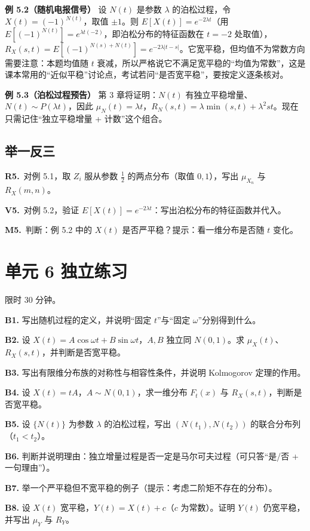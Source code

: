 \documentclass[UTF8,a4paper,11pt]{ctexart}
\newcommand{\PracticeQuestion}[3]{\par\Needspace{4\baselineskip}\noindent\begin{minipage}{\linewidth}\textbf{#1.}\ #2\par\noindent\rule{0pt}{#3mm}\par\end{minipage}\par}
\begin{document}
\textbf{例 5.2（随机电报信号）} 设 $N(t)$ 是参数 $\lambda$ 的泊松过程，令 $X(t)=(-1)^{N(t)}$，取值 $\pm1$。则 $E[X(t)]=e^{-2\lambda t}$（用 $E[(-1)^{N(t)}]=e^{\lambda t(-2)}$，即泊松分布的特征函数在 $t=-2$ 处取值），$R_X(s,t)=E[(-1)^{N(s)+N(t)}]=e^{-2\lambda|t-s|}$。它宽平稳，但均值不为常数方向需要注意：本题均值随 $t$ 衰减，所以严格说它不满足宽平稳的“均值为常数”，这是课本常用的“近似平稳”讨论点，考试若问“是否宽平稳”，要按定义逐条核对。

\textbf{例 5.3（泊松过程预告）} 第 3 章将证明：$N(t)$ 有独立平稳增量、$N(t)\sim P(\lambda t)$，因此 $\mu_{N}(t)=\lambda t$，$R_N(s,t)=\lambda\min(s,t)+\lambda^2st$。现在只需记住“独立平稳增量 + 计数”这个组合。

\subsection{举一反三}
\PracticeQuestion{R5}{对例 5.1，取 $Z_i$ 服从参数 $\frac12$ 的两点分布（取值 $0,1$），写出 $\mu_{X_n}$ 与 $R_X(m,n)$。}{44}
\PracticeQuestion{V5}{对例 5.2，验证 $E[X(t)]=e^{-2\lambda t}$：写出泊松分布的特征函数并代入。}{29}
\PracticeQuestion{M5}{判断：例 5.2 中的 $X(t)$ 是否严平稳？提示：看一维分布是否随 $t$ 变化。}{43}
\clearpage
{}
\section{单元 6 独立练习}
限时 30 分钟。

\textbf{B1.} 写出随机过程的定义，并说明“固定 $t$”与“固定 $\omega$”分别得到什么。

\textbf{B2.} 设 $X(t)=A\cos\omega t+B\sin\omega t$，$A,B$ 独立同 $N(0,1)$。求 $\mu_X(t)$、$R_X(s,t)$，并判断是否宽平稳。

\textbf{B3.} 写出有限维分布族的对称性与相容性条件，并说明 Kolmogorov 定理的作用。

\textbf{B4.} 设 $X(t)=tA$，$A\sim N(0,1)$，求一维分布 $F_t(x)$ 与 $R_X(s,t)$，判断是否宽平稳。

\textbf{B5.} 设 $\{N(t)\}$ 为参数 $\lambda$ 的泊松过程，写出 $(N(t_1),N(t_2))$ 的联合分布列（$t_1<t_2$）。

\textbf{B6.} 判断并说明理由：独立增量过程是否一定是马尔可夫过程（可只答“是/否 + 一句理由”）。

\textbf{B7.} 举一个严平稳但不宽平稳的例子（提示：考虑二阶矩不存在的分布）。

\textbf{B8.} 设 $X(t)$ 宽平稳，$Y(t)=X(t)+c$（$c$ 为常数）。证明 $Y(t)$ 仍宽平稳，并写出 $\mu_Y$ 与 $R_Y$。
\end{document}
